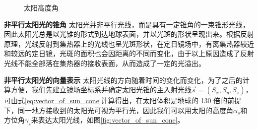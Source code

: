 \documentclass[withoutpreface,bwprint]{cumcmthesis} %
\begin{document}
\begin{figure}
    \centering
    \caption{太阳高度角}
\end{figure}

\textbf{非平行太阳光的锥角} \space 太阳光并非平行光线，而是具有一定锥角的一束锥形光线，因此太阳光总是以光锥的形式到达地球表面，并以光斑的形状呈现出来。根据反射原理，光线反射到集热器上的光线也呈光斑形状，在定日镜场中，有离集热器较近和较远的定日镜，光斑的面积也会因距离的不同而变化，由于以上原因造成了反射光线不能全部落在集热器的接收表面，从而造成了一定的光溢出。

\textbf{非平行太阳光的向量表示} \space 太阳光线的方向随着时间的变化而变化，为了之后的计算方便，我们先建立镜场坐标系并确定太阳光锥的主入射光线$\vec{s}=(S_{x},S_{y},S_{z})$，可由式\ref{eq:vector_of_sun_cone}计算得出，在太阳体积是地球的 130 倍的前提下，同一地方接收到的太阳光可视为平行光，因此我们可以用太阳的高度角$\alpha_{s}$和方位角$\gamma_{s}$来表达太阳光线，如图\ref{fig:vector_of_sun_cone}。
\end{document}
